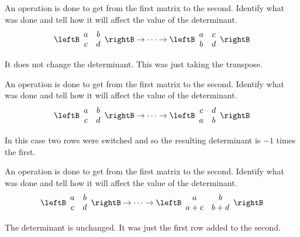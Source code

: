 \begin{enumialphparenastyle}

\begin{ex} An operation is done to get from the first matrix to the second.
Identify what was done and tell how it will affect the value of the
determinant. 
\begin{equation*}
\leftB
\begin{array}{cc}
a & b \\
c & d
\end{array}
\rightB  \rightarrow \cdots \rightarrow \leftB
\begin{array}{cc}
a & c \\
b & d
\end{array}
\rightB
\end{equation*}
\begin{sol}
It does not change the determinant. This was just taking the transpose.
\end{sol}
\end{ex}

\begin{ex} An operation is done to get from the first matrix to the second.
Identify what was done and tell how it will affect the value of the
determinant. 
\begin{equation*}
\leftB
\begin{array}{cc}
a & b \\
c & d
\end{array}
\rightB \rightarrow \cdots \rightarrow \leftB
\begin{array}{cc}
c & d \\
a & b
\end{array}
\rightB
\end{equation*}
\begin{sol}
In this case two rows were switched and so the resulting determinant is $-1$
times the first.
\end{sol}
\end{ex}


\begin{ex} An operation is done to get from the first matrix to the second.
Identify what was done and tell how it will affect the value of the
determinant. 
\begin{equation*}
\leftB
\begin{array}{cc}
a & b \\
c & d
\end{array}
\rightB \rightarrow \cdots \rightarrow \leftB
\begin{array}{cc}
a & b \\
a+c & b+d
\end{array}
\rightB
\end{equation*}
\begin{sol}
The determinant is unchanged. It was just the first row added to the second.
\end{sol}
\end{ex}



\end{enumialphparenastyle}
